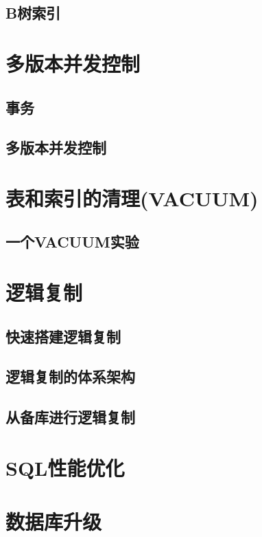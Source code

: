 \documentclass[lang=cn,newtx,10pt,scheme=chinese]{elegantbook}
\begin{document}
\section{B树索引}

\chapter{多版本并发控制}
\section{事务}
\section{多版本并发控制}

\chapter{表和索引的清理(VACUUM)}
\section{一个VACUUM实验}

\chapter{逻辑复制}
\section{快速搭建逻辑复制}
\section{逻辑复制的体系架构}
\section{从备库进行逻辑复制}

\chapter{SQL性能优化}

\chapter{数据库升级}
\end{document}

